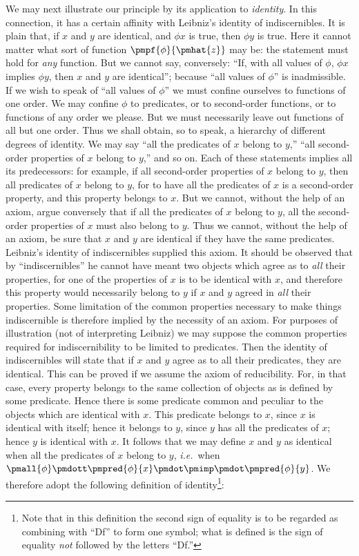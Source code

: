 \documentclass[letterpaper,12pt,openany,leqno]{book}
\newcommand{\pagefirst}[1]{\marginnote[\boxed{\text{#1}}]{\boxed{\text{#1}}}}
\begin{document}
We may next illustrate our principle by its application to \textit{identity}. In this connection, it has a certain affinity with Leibniz's identity of indiscernibles. It is plain that, if $x$ and $y$ are identical, and $\phi x$ is true, then $\phi y$ is true. Here it cannot matter what sort of function $\pmpf{\phi}{\pmhat{z}}$ may be: the statement must hold for \textit{any} function. But we cannot say, conversely: ``If, with all values of $\phi$, $\phi x$ implies $\phi y$, then $x$ and $y$ are identical''; because ``all values of $\phi$'' is inadmissible. If we wish to speak of ``all values of $\phi$'' we must confine ourselves to functions of one order. We may confine $\phi$ to predicates, or to \pagefirst{60} second-order functions, or to functions of any order we please. But we must necessarily leave out functions of all but one order. Thus we shall obtain, so to speak, a hierarchy of different degrees of identity. We may say ``all the predicates of $x$ belong to $y$,'' ``all second-order properties of $x$ belong to $y$,'' and so on. Each of these statements implies all its predecessors: for example, if all second-order properties of $x$ belong to $y$, then all predicates of $x$ belong to $y$, for to have all the predicates of $x$ is a second-order property, and this property belongs to $x$. But we cannot, without the help of an axiom, argue conversely that if all the predicates of $x$ belong to $y$, all the second-order properties of $x$ must also belong to $y$. Thus we cannot, without the help of an axiom, be sure that $x$ and $y$ are identical if they have the same predicates. Leibniz's identity of indiscernibles supplied this axiom. It should be observed that by ``indiscernibles'' he cannot have meant two objects which agree as to \textit{all} their properties, for one of the properties of $x$ is to be identical with $x$, and therefore this property would necessarily belong to $y$ if $x$ and $y$ agreed in \textit{all} their properties. Some limitation of the common properties necessary to make things indiscernible is therefore implied by the necessity of an axiom. For purposes of illustration (not of interpreting Leibniz) we may suppose the common properties required for indiscernibility to be limited to predicates. Then the identity of indiscernibles will state that if $x$ and $y$ agree as to all their predicates, they are identical. This can be proved if we assume the axiom of reducibility. For, in that case, every property belongs to the same collection of objects as is defined by some predicate. Hence there is some predicate common and peculiar to the objects which are identical with $x$. This predicate belongs to $x$, since $x$ is identical with itself; hence it belongs to $y$, since $y$ has all the predicates of $x$; hence $y$ is identical with $x$. It follows that we may define $x$ and $y$ as identical when all the predicates of $x$ belong to $y$, \textit{i.e.}\ when $\pmall{\phi} \pmdott \pmpred{\phi}{x} \pmdot \pmimp \pmdot \pmpred{\phi}{y}$. We therefore adopt the following definition of identity\footnote{Note that in this definition the second sign of equality is to be regarded as combining with ``Df'' to form one symbol; what is defined is the sign of equality \textit{not} followed by the letters ``Df.''}:
\end{document}
